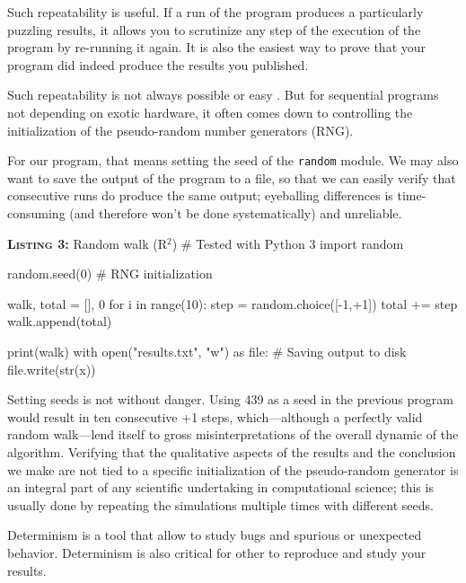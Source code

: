 \documentclass[a4paper,11pt]{article}
\begin{document}
Such repeatability is useful. 
If a run of the program produces a particularly puzzling results, 
it allows you to scrutinize any step of the execution of the program by re-running it again. 
It is also the easiest way to prove that your program did indeed produce the results you published.

Such repeatability is not always possible or easy \cite{Diethelm:2012}. But for sequential programs not depending on exotic hardware, it often comes down to controlling the initialization of the pseudo-random number generators (RNG). 

For our program, that means setting the seed of the {\tt random}  module. We may also want to save the output of the program to a file, so that we can easily verify that consecutive runs do produce the same output; eyeballing differences is time-consuming (and therefore won't be done systematically) and unreliable.

\begin{code}{\textbf{\textsc{Listing 3:}} Random walk (R$^2$)}
# Tested with Python 3
import random

random.seed(0) # RNG initialization

walk, total = [], 0
for i in range(10):
    step = random.choice([-1,+1])     
    total += step
    walk.append(total)
    
print(walk)
with open("results.txt", "w") as file: # Saving output to disk
    file.write(str(x))
\end{code}

Setting seeds is not without danger. 
Using 439 as a seed in the previous program would result in ten consecutive +1 steps, which---although a perfectly valid random walk---lend itself to gross misinterpretations of the overall dynamic of the algorithm. 
Verifying that the qualitative aspects of the results and the conclusion we make are not tied to a specific initialization of the pseudo-random generator is an integral part of any scientific undertaking in computational science; 
this is usually done by repeating the simulations multiple times with different seeds.  

Determinism is a tool that allow to study bugs and spurious or unexpected behavior. 
Determinism is also critical for other to reproduce and study your results. 
\end{document}
